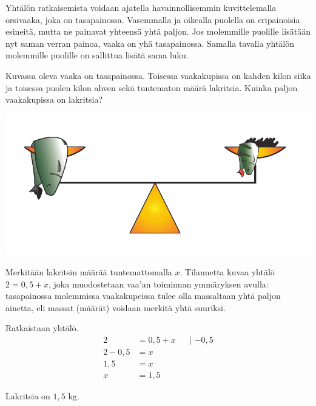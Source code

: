 Yhtälön ratkaisemista voidaan ajatella havainnollisemmin kuvittelemalla orsivaaka, joka on tasapainossa. Vasemmalla ja oikealla puolella on eripainoisia esineitä, mutta ne painavat yhteensä yhtä paljon. Jos molemmille puolille lisätään nyt saman verran painoa, vaaka on yhä tasapainossa. Samalla tavalla yhtälön molemmille puolille on sallittua lisätä sama luku.

\begin{esimerkki}
Kuvassa oleva vaaka on tasapainossa. Toisessa vaakakupissa on kahden kilon siika ja toisessa puolen kilon ahven sekä tuntematon määrä lakritsia.	Kuinka paljon vaakakupissa on lakritsia?
	\begin{center}
		\includegraphics[scale=0.6]{pictures/Kuva10-1-vaaka.pdf} %
	\end{center}
	\begin{esimratk}
Merkitään lakritsin määrää tuntemattomalla $x$. Tilannetta kuvaa yhtälö $2 = 0,5 + x$, joka muodostetaan vaa'an toiminnan ymmäryksen avulla: tasapainossa molemmissa vaakakupeissa tulee olla massaltaan yhtä paljon ainetta, eli massat (määrät) voidaan merkitä yhtä suuriksi.

Ratkaistaan yhtälö.
		\begin{align*}
			2 &= 0,5 + x &&\text{| $-0,5$} \\
			2 - 0,5 &= x && \\
			1,5 &= x && \\
			x &= 1,5 &&
		\end{align*}
	\end{esimratk}
	\begin{esimvast}
		Lakritsia on $1,5$ kg.
	\end{esimvast}
\end{esimerkki}

